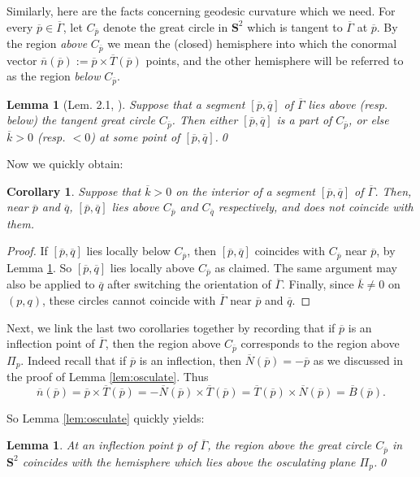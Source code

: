 \documentclass[11pt]{amsart}
\newtheorem{lem}[thm]{Lemma}
\newtheorem{cor}[thm]{Corollary}
\theoremstyle{definition}
\newcommand{\ol}{\overline}
\renewcommand{\S}{\mathbf{S}}
\renewcommand{\(}{\left(}
\renewcommand{\)}{\right)}
\begin{document}
Similarly, here are the  facts concerning geodesic curvature which we need. For every $\ol p\in\ol\Gamma$, let $C_{\ol p}$ denote the great circle in $\S^2$ which is tangent to $\ol\Gamma$ at $\ol p$. By the region \emph{above} $C_{\ol p}$ we mean the (closed) hemisphere into which the conormal vector $\ol n(\ol p):=\ol p\times \ol T(\ol p)$ points, and the other hemisphere will be referred to as the region \emph{below} $C_{\ol p}$.

\begin{lem}[Lem. 2.1, \cite{ghomi:verticesC}]\label{lem:maxprinciplecurvature}
Suppose that  a segment $[\ol p, \ol q]$ of $\ol\Gamma$ lies above (resp. below) the tangent great circle $C_{\ol p}$. Then either  $[\ol p, \ol q]$ is a part of $C_{\ol p}$, or else $\ol k > 0$ (resp. $< 0$) at some point of $[\ol p, \ol q]$.\qed
\end{lem}

Now we quickly obtain:

\begin{cor}\label{cor:maxprinciplecurvature}
Suppose that $\ol k>0$ on the interior of a segment $[\ol p,\ol q]$ of $\ol\Gamma$. Then, near $\ol p$ and $\ol q$,  $[\ol p, \ol q]$ lies above $C_{\ol p}$ and $C_{\ol q}$ respectively, and does not coincide with them.
\end{cor}
\begin{proof}
If $[\ol p,\ol q]$ lies locally below  $C_{\ol p}$, then $[\ol p, \ol q]$  coincides with $C_{\ol p}$ near $\ol p$, by Lemma \ref{lem:maxprinciplecurvature}. So $[\ol p, \ol q]$ lies locally above $C_{\ol p}$ as claimed. The same argument may also be applied to $\ol q$ after switching the orientation of $\ol\Gamma$. Finally, since $\ol k\neq 0$ on $(p,q)$, these circles cannot coincide with $\ol\Gamma$ near $\ol p$ and $\ol q$.
\end{proof}

Next, we link the last two corollaries together by recording that if $\ol p$ is an inflection point of $\ol\Gamma$, then the region above $C_{\ol p}$ corresponds to the region above $\Pi_{p}$. Indeed recall that if $\ol p$ is an inflection, then $\ol N(\ol p)=-\ol p$ as we discussed in the proof of Lemma \ref{lem:osculate}. Thus
$$
\ol n(\ol p)=\ol p\times \ol T(\ol p)=-\ol N(\ol p)\times \ol T(\ol p)=\ol T(\ol p)\times \ol N(\ol p)=\ol B(\ol p).
$$

So Lemma \ref{lem:osculate} quickly yields:


\begin{lem}\label{lem:above}
At an inflection point  $\ol p$ of $\ol\Gamma$, the region above the great circle $C_{\ol p}$ in $\S^2$ coincides with the hemisphere which lies above the osculating plane $\Pi_p$.\qed
\end{lem}
\end{document}
